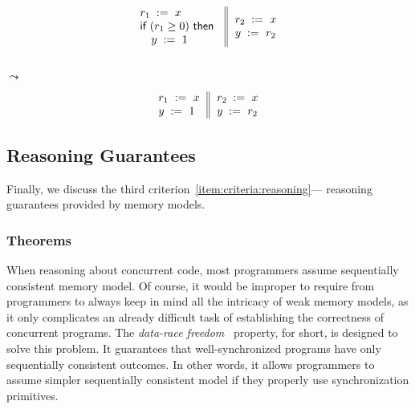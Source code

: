 {\footnotesize
\begin{minipage}{0.45\linewidth}
\begin{equation*}
\inarrII{
   \readInst{}{r_1}{x}             \\
   \kw{if} (r_1 \geq 0) ~\kw{then} \\
   \quad\writeInst{}{y}{1}         \\
}{
  \readInst{}{r_2}{x}               \\
  \writeInst{}{y}{r_2}              \\
}
\end{equation*}
\end{minipage}\hfill%
\begin{minipage}{0.05\linewidth}
\Large~\\ $\leadsto$
\end{minipage}\hfill%
\begin{minipage}{0.4\linewidth}
\begin{equation*}
\inarrII{
   \readInst{}{r_1}{x}             \\
   \writeInst{}{y}{1}              \\
}{
  \readInst{}{r_2}{x}               \\
  \writeInst{}{y}{r_2}              \\
}
\end{equation*}
\end{minipage}
}

\subsection{Reasoning Guarantees}


Finally, we discuss the third criterion~\ref{item:criteria:reasoning}---%
reasoning guarantees provided by memory models. 

\subsubsection{\DRF Theorems}
\label{sec:background:drf}

When reasoning about concurrent code, most programmers 
assume sequentially consistent memory model.
Of course, it would be improper to require from 
programmers to always keep in mind 
all the intricacy of weak memory models,
as it only complicates an already difficult task
of establishing the correctness of concurrent programs. 
The \emph{data-race freedom}~\cite{Manson-al:POPL05} property, 
\DRF for short, is designed to solve this problem. 
It guarantees that well-synchronized programs 
have only sequentially consistent outcomes. 
In other words, it allows programmers to assume 
simpler sequentially consistent model 
if they properly use synchronization primitives.

